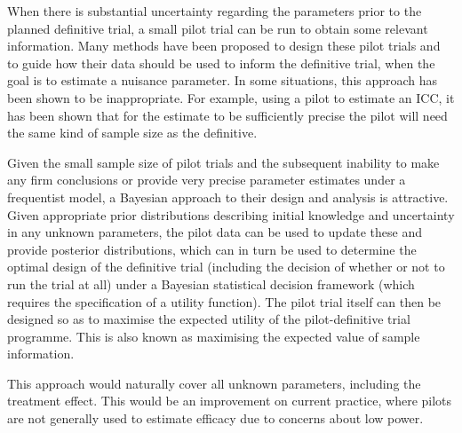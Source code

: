 \documentclass[sagev, Crown]{sagej} %
\begin{document}
When there is substantial uncertainty regarding the parameters prior to the planned definitive trial, a small pilot trial can be run to obtain some relevant information. Many methods have been proposed to design these pilot trials and to guide how their data should be used to inform the definitive trial, when the goal is to estimate a nuisance parameter. In some situations, this approach has been shown to be inappropriate. For example, using a pilot to estimate an ICC, it has been shown that for the estimate to be sufficiently precise the pilot will need the same kind of sample size as the definitive.
\cite{Teare2014}
\cite{Julious2006}
\cite{Whitehead2015}
\cite{Eldridge2015}
\cite{Lake2002}
\cite{Grayling2018}
\cite{Proschan2005}
\cite{Schie2014}
\cite{Wittes1990}

Given the small sample size of pilot trials and the subsequent inability to make any firm conclusions or provide very precise parameter estimates under a frequentist model, a Bayesian approach to their design and analysis is attractive. Given appropriate prior distributions describing initial knowledge and uncertainty in any unknown parameters, the pilot data can be used to update these and provide posterior distributions, which can in turn be used to determine the optimal design of the definitive trial (including the decision of whether or not to run the trial at all) under a Bayesian statistical decision framework (which requires the specification of a utility function). The pilot trial itself can then be designed so as to maximise the expected utility of the pilot-definitive trial programme. This is also known as maximising the expected value of sample information.
\cite{Lindley1957}
\cite{Gittins2000}
\cite{Gittins2000a}
\cite{Gittins2002}
\cite{Halpern2001}
\cite{Willan2005}
\cite{Turner2004}
\cite{Spiegelhalter2001}

This approach would naturally cover all unknown parameters, including the treatment effect. This would be an improvement on current practice, where pilots are not generally used to estimate efficacy due to concerns about low power. 
\cite{Cocks2013}
\cite{Lee2012}
\cite{Sim2019}
\cite{Lancaster2004}
\cite{Arain2010}
\cite{Thabane2010}
\cite{Stallard2012}
\end{document}
